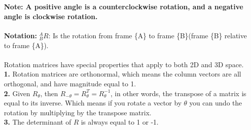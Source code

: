 \documentclass{article}
\begin{document}
\\\\
\textbf{Note: A positive angle is a counterclockwise rotation, and a negative angle is clockwise rotation.}\\\\
\textbf{Notation: } ${}^A_BR$: Is the rotation from frame \{A\} to frame \{B\}(frame \{B\} relative to frame \{A\}).\\\\
Rotation matrices have special properties that apply to both 2D and 3D space.\\
\textbf{1.} Rotation matrices are orthonormal, which means the column vectors are all orthogonal, and have magnitude equal to 1.\\
\textbf{2.} Given $R_{\theta}$, then $R_{-\theta}=R_{\theta}^T=R_{\theta}^{-1}$, in other words, the transpose of a matrix is equal to its inverse. Which means if you rotate a vector by $\theta$ you can undo the rotation by multiplying by the transpose matrix.\\
\textbf{3.} The determinant of $R$ is always equal to 1 or -1.
\newpage
\end{document}
